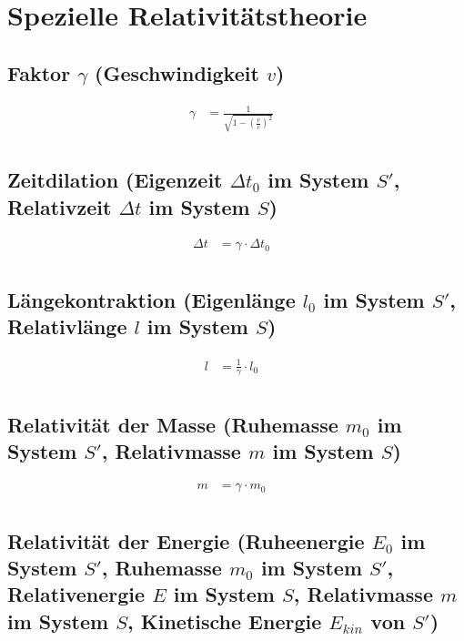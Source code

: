 \section{Spezielle Relativitätstheorie}

\subsection{Faktor $\gamma$ (Geschwindigkeit $v$)}

\begin{align*}
  \gamma &= \frac{1}{\sqrt{1 - \left(\frac{v}{c}\right)^2}} &\\
\end{align*}

\subsection{Zeitdilation (Eigenzeit $\Delta t_0$ im System $S'$, Relativzeit $\Delta t$ im System
$S$)}

\begin{align*}
  \Delta t &= \gamma \cdot \Delta t_0 &\\
\end{align*}

\subsection{Längekontraktion (Eigenlänge $l_0$ im System $S'$, Relativlänge $l$ im System
$S$)}

\begin{align*}
  l &= \frac{1}{\gamma} \cdot l_0 &\\
\end{align*}

\subsection{Relativität der Masse (Ruhemasse $m_0$ im System $S'$, Relativmasse $m$ im System
$S$)}

\begin{align*}
  m &= \gamma \cdot m_0 &\\
\end{align*}

\subsection{Relativität der Energie (Ruheenergie $E_0$ im System $S'$, Ruhemasse $m_0$ im System
$S'$, Relativenergie $E$ im System $S$, Relativmasse $m$ im System $S$, Kinetische Energie
$E_{kin}$ von $S'$)}


